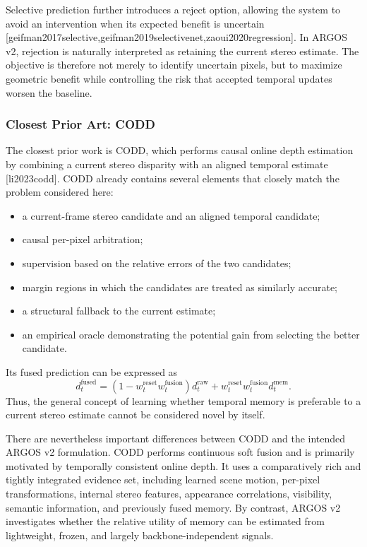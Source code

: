 \documentclass[11pt,a4paper]{article}
\providecommand{\citep}[1]{[#1]}
\begin{document}
Selective prediction further introduces a reject option, allowing the system to avoid an intervention when its expected benefit is uncertain \citep{geifman2017selective,geifman2019selectivenet,zaoui2020regression}. In ARGOS v2, rejection is naturally interpreted as retaining the current stereo estimate. The objective is therefore not merely to identify uncertain pixels, but to maximize geometric benefit while controlling the risk that accepted temporal updates worsen the baseline.

\subsubsection{Closest Prior Art: CODD}

The closest prior work is CODD, which performs causal online depth estimation by combining a current stereo disparity with an aligned temporal estimate \citep{li2023codd}. CODD already contains several elements that closely match the problem considered here:

\begin{itemize}
    \item a current-frame stereo candidate and an aligned temporal candidate;
    \item causal per-pixel arbitration;
    \item supervision based on the relative errors of the two candidates;
    \item margin regions in which the candidates are treated as similarly accurate;
    \item a structural fallback to the current estimate;
    \item an empirical oracle demonstrating the potential gain from selecting the better candidate.
\end{itemize}

Its fused prediction can be expressed as
\begin{equation}
    d_t^{\mathrm{fused}}
    =
    \left(1-w_t^{\mathrm{reset}}w_t^{\mathrm{fusion}}\right)
    d_t^{\mathrm{raw}}
    +
    w_t^{\mathrm{reset}}w_t^{\mathrm{fusion}}
    d_t^{\mathrm{mem}}.
\end{equation}
Thus, the general concept of learning whether temporal memory is preferable to a current stereo estimate cannot be considered novel by itself.

There are nevertheless important differences between CODD and the intended ARGOS v2 formulation. CODD performs continuous soft fusion and is primarily motivated by temporally consistent online depth. It uses a comparatively rich and tightly integrated evidence set, including learned scene motion, per-pixel transformations, internal stereo features, appearance correlations, visibility, semantic information, and previously fused memory. By contrast, ARGOS v2 investigates whether the relative utility of memory can be estimated from lightweight, frozen, and largely backbone-independent signals.
\end{document}

